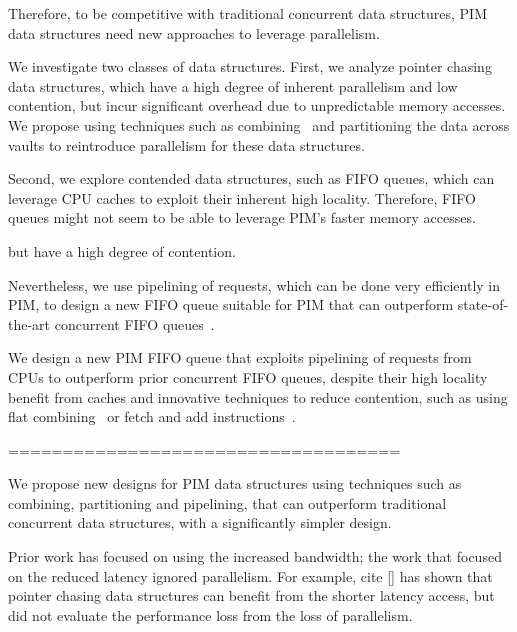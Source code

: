 Therefore, to be competitive with traditional concurrent data structures, PIM data structures need new approaches to leverage parallelism. 






 




We 
investigate two classes of data structures. First, we analyze pointer chasing data 
structures, which have a high degree of inherent parallelism and low contention, but incur significant 
overhead due to unpredictable memory accesses. 
We propose using techniques such as combining~\cite{} and partitioning 
the data across vaults to reintroduce parallelism for these data structures.



Second, we explore contended data structures, such as FIFO queues,
 which can leverage CPU caches to exploit their inherent high locality. 
Therefore, FIFO queues might not seem to be able to leverage PIM's faster memory accesses. 

but have a high degree of contention. 

Nevertheless, we use pipelining of requests, which can be done very efficiently in PIM, to design a new FIFO queue suitable for PIM that can outperform state-of-the-art concurrent FIFO queues~\cite{}.


 We design a new PIM FIFO queue that exploits pipelining of requests from CPUs to outperform prior concurrent FIFO queues, despite their high locality benefit from caches and innovative techniques to reduce contention, such as using flat combining~\cite{} or fetch and add instructions~\cite{}. 

====================================

We propose new designs for PIM 
data structures using 
techniques such as combining, partitioning and pipelining, that can outperform traditional 
concurrent data structures, with a significantly simpler design. 




Prior work has focused on using the increased bandwidth; the work that focused on the reduced latency ignored parallelism. For example, cite [] has shown that pointer chasing data structures can benefit from the shorter latency access, but did not evaluate the performance loss from the loss of parallelism. 



